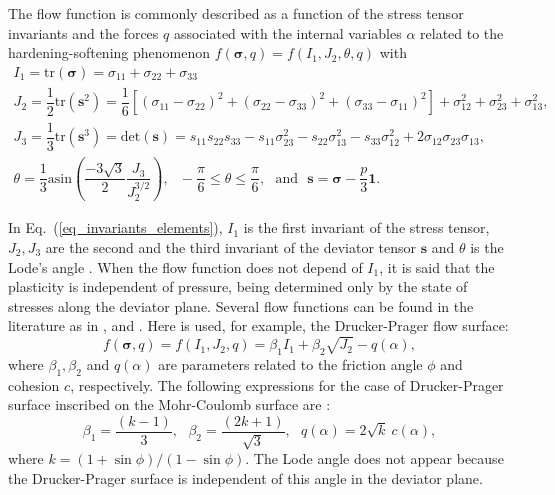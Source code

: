 \documentclass[Journal,letterpaper]{ascelike-new}
\newcommand{\onell}{\boldsymbol{1}}
\newcommand{\sll}{\boldsymbol{s}}
\newcommand{\stress}{\boldsymbol{\sigma}}
\begin{document}
The flow function is commonly described as a function of the stress tensor invariants and the forces $q$ associated with the internal variables $\alpha$ related to the hardening-softening phenomenon $f(\stress,q) = f(I_1,J_2,\theta,q)$ with
\begin{equation} \label{eq_invariants_elements}
	\begin{array}{lcl}
		I_1 = \text{tr}(\stress) = \sigma_{11}+\sigma_{22}+\sigma_{33}\\
		J_2 = \dfrac{1}{2}\text{tr}(\sll^2) = \dfrac{1}{6}\left[ (\sigma_{11}-\sigma_{22})^2 + (\sigma_{22}-\sigma_{33})^2 + (\sigma_{33}-\sigma_{11})^2 \right] + \sigma_{12}^2+ \sigma_{23}^2+ \sigma_{13}^2, \\
		J_3 = \dfrac{1}{3}\text{tr}(\sll^3) = \text{det}(\sll) = s_{11}s_{22}s_{33}-s_{11}\sigma_{23}^2-s_{22}\sigma_{13}^2-s_{33}\sigma_{12}^2+2\sigma_{12}\sigma_{23}\sigma_{13}, \\ 
		\theta = \dfrac{1}{3}\text{asin}\left( \dfrac{-3\sqrt{3}}{2} \dfrac{J_3}{J_2^{3/2}} \right),~~~
		-\dfrac{\pi}{6} \le \theta \le \dfrac{\pi}{6},~~~\text{and}~~~\sll = \stress - \dfrac{p}{3}\onell.
	\end{array}\;
\end{equation}

In Eq.~(\ref{eq_invariants_elements}), $I_1$ is the first invariant of the stress tensor, $J_2,J_3$ are the second and the third invariant of the deviator tensor $\sll$ and $\theta$ is the Lode's angle \cite{chen1988}. When the flow function does not depend of $I_1$, it is said that the plasticity is independent of pressure, being determined only by the state of stresses along the deviator plane. Several flow functions can be found in the literature as in ,  and . Here is used, for example, the Drucker-Prager flow surface:
\begin{equation}
	\label{eq:f_Drucker_Prager}
	f(\stress,q) = f(I_1,J_2,q) = \beta_1 I_1 +\beta_2 \sqrt{J_2}-q(\alpha),
\end{equation}
where $\beta_1, \beta_2$ and $q(\alpha)$ are parameters related to the friction angle $\phi$ and cohesion $c$, respectively. The following expressions for the case of Drucker-Prager surface inscribed on the Mohr-Coulomb surface are \cite{bernaud1991}:
\begin{equation}
	\label{eq:f_DP_inscrita_MC}
	\beta_1 = \dfrac{(k-1)}{3}, ~~~ \beta_2 = \dfrac{(2k+1)}{\sqrt{3}}, ~~~
	q(\alpha) = 2\sqrt{k}~c(\alpha),
\end{equation}
where $k = (1+\sin{\phi})/(1-\sin{\phi})$. The Lode angle does not appear because the Drucker-Prager surface is independent of this angle in the deviator plane.
\end{document}
